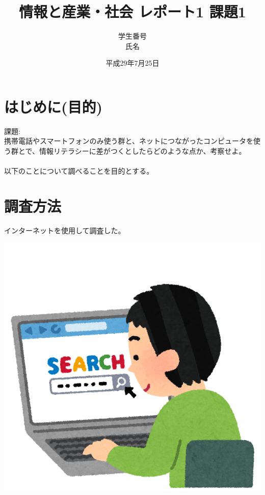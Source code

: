 \documentclass[a4paper,12pt]{jarticle}
\title{情報と産業・社会 レポート1 課題1}
\author{学生番号\\氏名}
\date{平成29年7月25日}
\begin{document}
\maketitle
\tableofcontents
\section{はじめに(目的)}
課題:\\
携帯電話やスマートフォンのみ使う群と、ネットにつながったコンピュータを使う群とで、情報リテラシーに差がつくとしたらどのような点か、考察せよ。\\
\\
以下のことについて調べることを目的とする。
\section{調査方法}
インターネットを使用して調査した。
\begin{center}
\includegraphics[width=100truemm]{computer_search_kensaku.png}
\end{center}
\end{document}
